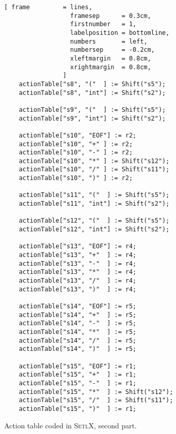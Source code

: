 \begin{figure}[!ht]
\centering
\begin{Verbatim}[ frame         = lines, 
                  framesep      = 0.3cm, 
                  firstnumber   = 1,
                  labelposition = bottomline,
                  numbers       = left,
                  numbersep     = -0.2cm,
                  xleftmargin   = 0.8cm,
                  xrightmargin  = 0.8cm,
                ]
    actionTable["s8", "("  ] := Shift("s5");
    actionTable["s8", "int"] := Shift("s2");
    
    actionTable["s9", "("  ] := Shift("s5");
    actionTable["s9", "int"] := Shift("s2");
    
    actionTable["s10", "EOF"] := r2;
    actionTable["s10", "+" ] := r2;
    actionTable["s10", "-" ] := r2;
    actionTable["s10", "*" ] := Shift("s12");
    actionTable["s10", "/" ] := Shift("s11");
    actionTable["s10", ")" ] := r2;
    
    actionTable["s11", "("  ] := Shift("s5");
    actionTable["s11", "int"] := Shift("s2");
    
    actionTable["s12", "("  ] := Shift("s5");
    actionTable["s12", "int"] := Shift("s2");
    
    actionTable["s13", "EOF"] := r4;
    actionTable["s13", "+"  ] := r4;
    actionTable["s13", "-"  ] := r4;
    actionTable["s13", "*"  ] := r4;
    actionTable["s13", "/"  ] := r4;
    actionTable["s13", ")"  ] := r4;
    
    actionTable["s14", "EOF"] := r5;
    actionTable["s14", "+"  ] := r5;
    actionTable["s14", "-"  ] := r5;
    actionTable["s14", "*"  ] := r5;
    actionTable["s14", "/"  ] := r5;
    actionTable["s14", ")"  ] := r5;
    
    actionTable["s15", "EOF"] := r1;
    actionTable["s15", "+"  ] := r1;
    actionTable["s15", "-"  ] := r1;
    actionTable["s15", "*"  ] := Shift("s12");
    actionTable["s15", "/"  ] := Shift("s11");
    actionTable["s15", ")"  ] := r1;
\end{Verbatim}
\vspace*{-0.3cm}
\caption{Action table coded in \textsc{SetlX}, second part.}
\label{fig:parse-table.stlx:action2}
\end{figure}


